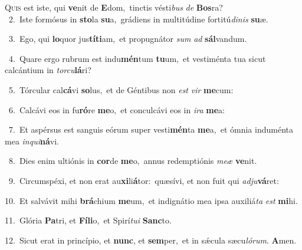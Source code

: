 \lettrine{\initial\textcolor{\initialcolor}{Q}}{uis} est iste, qui \textbf{ve}\-nit de \textbf{E}\-dom,~\star tinctis vésti\textit{bus} \textit{de} \textbf{Bos}\-ra?\\
{\numbfont\textcolor{\numbcolor}{~2.}}~Iste formósus in \textbf{sto}\-la \textbf{su}\-a,~\star grádiens in multitúdine fortitú\-\textit{di}\-\textit{nis} \textbf{su}\-æ.\par
{\numbfont\textcolor{\numbcolor}{~3.}}~Ego, qui \textbf{lo}\-quor jus\-\textbf{tí}\-\textbf{ti}am,~\star et propugnátor \textit{sum} \textit{ad} \textbf{sál}\-vandum.\par
{\numbfont\textcolor{\numbcolor}{~4.}}~Quare ergo rubrum est indu\-\textbf{mén}\-tum \textbf{tu}\-um,~\star et vestiménta tua sicut calcántium in \textit{tor}\-\textit{cu}\textbf{lá}ri?\par
{\numbfont\textcolor{\numbcolor}{~5.}}~Tórcular cal\-\textbf{cá}\-vi \textbf{so}\-lus,~\star et de Géntibus non \textit{est} \textit{vir} \textbf{me}\-cum:\par
{\numbfont\textcolor{\numbcolor}{~6.}}~Calcávi eos in fu\-\textbf{ró}\-re \textbf{me}\-o,~\star et conculcávi eos in \textit{i}\-\textit{ra} \textbf{me}\-a:\par
{\numbfont\textcolor{\numbcolor}{~7.}}~Et aspérsus est sanguis eórum super vesti\-\textbf{mén}\-ta \textbf{me}\-a,~\star et ómnia induménta mea \textit{in}\-\textit{qui}\textbf{ná}vi.\par
{\numbfont\textcolor{\numbcolor}{~8.}}~Dies enim ultiónis in \textbf{cor}\-de \textbf{me}\-o,~\star annus redemptiónis \textit{me}\-\textit{æ} \textbf{ve}\-nit.\par
{\numbfont\textcolor{\numbcolor}{~9.}}~Circumspéxi, et non erat au\-\textbf{xi}\-li\-\textbf{á}\-tor:~\star quæsívi, et non fuit qui \textit{ad}\-\textit{ju}\textbf{vá}ret:\par
{\numbfont\textcolor{\numbcolor}{10.}}~Et salvávit mihi \textbf{brá}\-chium \textbf{me}\-um,~\star et indignátio mea ipsa auxiliá\textit{ta} \textit{est} \textbf{mi}\-hi.\par
{\numbfont\textcolor{\numbcolor}{11.}}~Glória \textbf{Pa}\-tri, et \textbf{Fí}\-\textbf{li}o,~\star et Spirí\-\textit{tu}\-\textit{i} \textbf{Sanc}\-to.\par
{\numbfont\textcolor{\numbcolor}{12.}}~Sicut erat in princípio, et \textbf{nunc}\-, et \textbf{sem}\-per,~\star et in sǽcula sæcu\-\textit{ló}\-\textit{rum}. \textbf{A}\-men.\par
